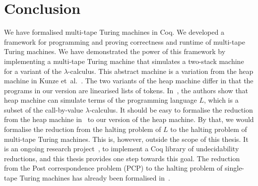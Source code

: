 \chapter{Conclusion}
\label{chap:conclusion}

We have formalised multi-tape Turing machines in Coq.  We developed a framework for programming and proving correctness and runtime of multi-tape
Turing machines.  We have demonstrated the power of this framework by implementing a multi-tape Turing machine that simulates a two-stack machine for
a variant of the $\lambda$-calculus.  This abstract machine is a variation from the heap machine in Kunze et~al.~\cite{KunzeEtAl:2018:Formal}.  The
two variants of the heap machine differ in that the programs in our version are linearised lists of tokens.  In~\cite{KunzeEtAl:2018:Formal}, the
authors show that heap machine can simulate terms of the programming language $L$, which is a subset of the call-by-value $\lambda$-calculus.  It
should be easy to formalise the reduction from the heap machine in~\cite{KunzeEtAl:2018:Formal} to our version of the heap machine.  By that, we would
formalise the reduction from the halting problem of $L$ to the halting problem of multi-tape Turing machines.  This is, however, outside the scope of
this thesis.  It is an ongoing research project~\cite{ForsterLOLA}, to implement a Coq library of undecidability reductions, and this thesis provides
one step towards this goal.  The reduction from the Post correspondence problem (PCP) to the halting problem of single-tape Turing machines has
already been formalised in~\cite{PCPITP}.

